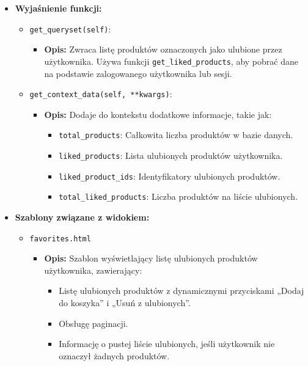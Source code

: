 \documentclass[12pt,a4paper,oneside]{article}
\theoremstyle{definition}
\numberwithin{equation}{section}
\begin{document}
\begin{itemize}
    \item \textbf{Wyjaśnienie funkcji:}
        \begin{itemize}
            \item \texttt{get\_queryset(self)}:
            \begin{itemize}
                \item \textbf{Opis:} Zwraca listę produktów oznaczonych jako ulubione przez użytkownika. Używa funkcji \texttt{get\_liked\_products}, aby pobrać dane na podstawie zalogowanego użytkownika lub sesji.
            \end{itemize}
            \item \texttt{get\_context\_data(self, **kwargs)}:
            \begin{itemize}
                \item \textbf{Opis:} Dodaje do kontekstu dodatkowe informacje, takie jak:
                \begin{itemize}
                    \item \texttt{total\_products}: Całkowita liczba produktów w bazie danych.
                    \item \texttt{liked\_products}: Lista ulubionych produktów użytkownika.
                    \item \texttt{liked\_product\_ids}: Identyfikatory ulubionych produktów.
                    \item \texttt{total\_liked\_products}: Liczba produktów na liście ulubionych.
                \end{itemize}
            \end{itemize}
        \end{itemize}

    \item \textbf{Szablony związane z widokiem:}
        \begin{itemize}
            \item \texttt{favorites.html}
                \begin{itemize}
                    \item \textbf{Opis:} Szablon wyświetlający listę ulubionych produktów użytkownika, zawierający:
                    \begin{itemize}
                        \item Listę ulubionych produktów z dynamicznymi przyciskami „Dodaj do koszyka” i „Usuń z ulubionych”.
                        \item Obsługę paginacji.
                        \item Informację o pustej liście ulubionych, jeśli użytkownik nie oznaczył żadnych produktów.
                    \end{itemize}
                \end{itemize}
        \end{itemize}


\end{itemize}
\end{document}
